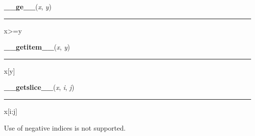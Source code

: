     \label{pygame:Rect:__ge__}

    \vspace{0.5ex}

\hspace{.8\funcindent}\begin{boxedminipage}{\funcwidth}

    \raggedright \textbf{\_\_ge\_\_}(\textit{x}, \textit{y})

    \vspace{-1.5ex}

    \rule{\textwidth}{0.5\fboxrule}
\setlength{\parskip}{2ex}
    x{\textgreater}=y

\setlength{\parskip}{1ex}
    \end{boxedminipage}

    \label{pygame:Rect:__getitem__}

    \vspace{0.5ex}

\hspace{.8\funcindent}\begin{boxedminipage}{\funcwidth}

    \raggedright \textbf{\_\_getitem\_\_}(\textit{x}, \textit{y})

    \vspace{-1.5ex}

    \rule{\textwidth}{0.5\fboxrule}
\setlength{\parskip}{2ex}
    x[y]

\setlength{\parskip}{1ex}
    \end{boxedminipage}

    \label{pygame:Rect:__getslice__}

    \vspace{0.5ex}

\hspace{.8\funcindent}\begin{boxedminipage}{\funcwidth}

    \raggedright \textbf{\_\_getslice\_\_}(\textit{x}, \textit{i}, \textit{j})

    \vspace{-1.5ex}

    \rule{\textwidth}{0.5\fboxrule}
\setlength{\parskip}{2ex}
    x[i:j]

    Use of negative indices is not supported.

\setlength{\parskip}{1ex}
    \end{boxedminipage}


